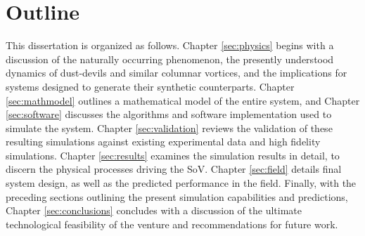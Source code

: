 %

\section{Outline}

This dissertation is organized as follows. Chapter \ref{sec:physics} begins
with a discussion of the naturally occurring phenomenon, the presently
understood dynamics of dust-devils and similar columnar vortices, and
the implications for systems designed to generate their synthetic
counterparts.  
Chapter \ref{sec:mathmodel} outlines a mathematical model of
the entire system, and Chapter \ref{sec:software} discusses the
algorithms and software implementation used to simulate the
system. Chapter \ref{sec:validation} reviews the validation of
these resulting simulations against existing experimental data and high 
fidelity simulations.  
Chapter \ref{sec:results} examines the simulation results in detail, to
discern the physical processes driving the SoV. Chapter \ref{sec:field}
details final system design, as well as the predicted performance in the
field.  
%
%
%
Finally, with the preceding sections outlining the present simulation
capabilities and predictions, Chapter \ref{sec:conclusions} concludes
with a discussion of the ultimate technological feasibility of the
venture and recommendations for future work. 

%
